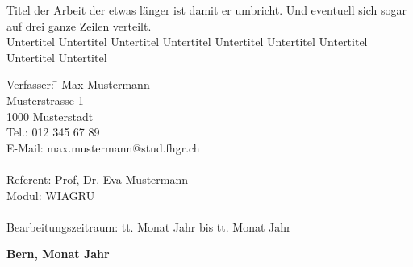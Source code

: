 \begin{titlepage}
    
    \begin{center}
        \huge{Titel der Arbeit der etwas länger ist damit er umbricht. Und eventuell sich sogar auf drei ganze Zeilen verteilt.}\\
         \vfill
        \large{Untertitel Untertitel Untertitel Untertitel Untertitel Untertitel Untertitel Untertitel Untertitel}
    \end{center}
    
    \vfill
    
    \begin{tabbing}
    Verfasser:  \=\hspace*{2.5cm} Max Mustermann\\
                \>\hspace*{2.5cm} Musterstrasse 1\\
                \>\hspace*{2.5cm} 1000 Musterstadt\\
                \>\hspace*{2.5cm} Tel.: 012 345 67 89\\
                \>\hspace*{2.5cm} E-Mail: max.mustermann@stud.fhgr.ch\\
                \\
    Referent:   \>\hspace*{2.5cm} Prof, Dr. Eva Mustermann\\
    Modul:      \>\hspace*{2.5cm} WIAGRU\\
                \\
    Bearbeitungszeitraum: \>\hspace*{2.5cm} tt. Monat Jahr bis tt. Monat Jahr
    \end{tabbing}
    
    \vfill
    
    \begin{center} 
        \textbf{Bern, Monat Jahr}
    \end{center}

\end{titlepage}